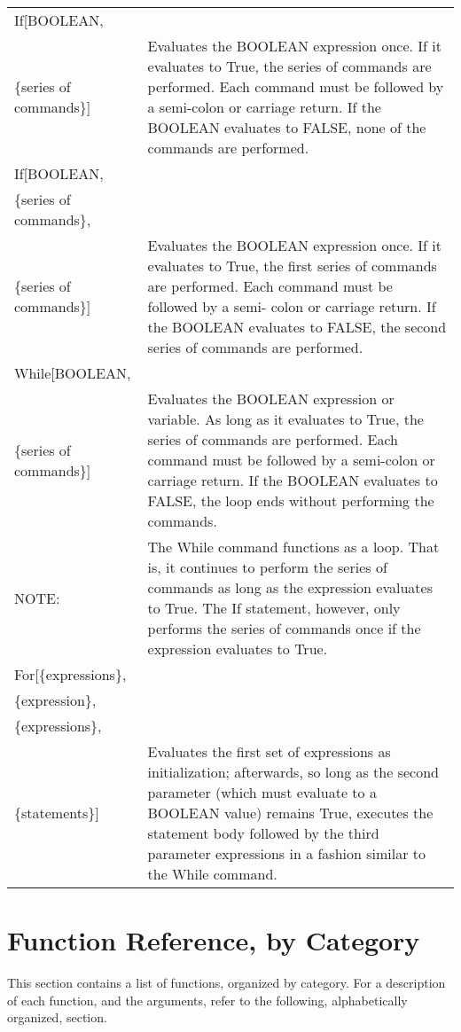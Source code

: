 \begin{tabular}{lp{4in}}
If[BOOLEAN, & \\
\{series of commands\}] & Evaluates the BOOLEAN expression
once. If it evaluates to True, the series of commands are performed.
Each command must be followed by a semi-colon or carriage return.  If
the BOOLEAN evaluates to FALSE, none of the commands are performed.\\
If[BOOLEAN, & \\
\{series of commands\}, & \\
\{series of commands\}] & Evaluates the BOOLEAN expression
once. If it evaluates to True, the first series of commands are
performed.  Each command must be followed by a semi- colon or carriage
return.  If the BOOLEAN evaluates to FALSE, the second series of
commands are performed. \\
While[BOOLEAN, &\\
\{series of commands\}] & Evaluates the BOOLEAN
expression or variable.  As long as it evaluates to True, the series
of commands are performed.  Each command must be followed by a
semi-colon or carriage return.  If the BOOLEAN evaluates to FALSE, the
loop ends without performing the commands.\\
NOTE: & The While command functions as a
loop.  That is, it continues to perform the series of commands as long
as the expression evaluates to True.  The If statement, however, only
performs the series of commands once if the expression evaluates to
True.\\
For[\{expressions\}, & \\
\{expression\}, & \\
\{expressions\}, & \\
\{statements\}] & Evaluates the first set of expressions as initialization;
afterwards, so long as the second parameter (which must evaluate to a 
BOOLEAN value) remains True, executes the statement body followed by the
third parameter expressions in a fashion similar to the While command.
\end{tabular}

\section{Function Reference, by Category}

This section contains a list of functions, organized by
category.  For a description of each function, and the arguments,
refer to the following, alphabetically organized, section.

